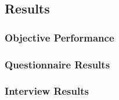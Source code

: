 \documentclass[manuscript,review,anonymous]{acmart}
\begin{document}
\subsection{Results}

\subsubsection{Objective Performance}

\subsubsection{Questionnaire Results}

\subsubsection{Interview Results}


\end{document}
